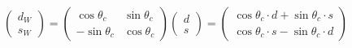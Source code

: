 \begin{equation}
\left( \begin{array}{c}
d_W \\ s_W
\end{array} \right) =
\left( \begin{array}{cc}
\cos \theta_c  & \sin \theta_c\\
-\sin \theta_c & \cos \theta_c
\end{array} \right)
\left( \begin{array}{c}
d \\ s
\end{array} \right) = 
\left( \begin{array}{c}
\cos\theta_c \cdot d + \sin \theta_c \cdot s \\
\cos \theta_c \cdot s - \sin \theta_c \cdot d
\end{array} \right)
\end{equation}


